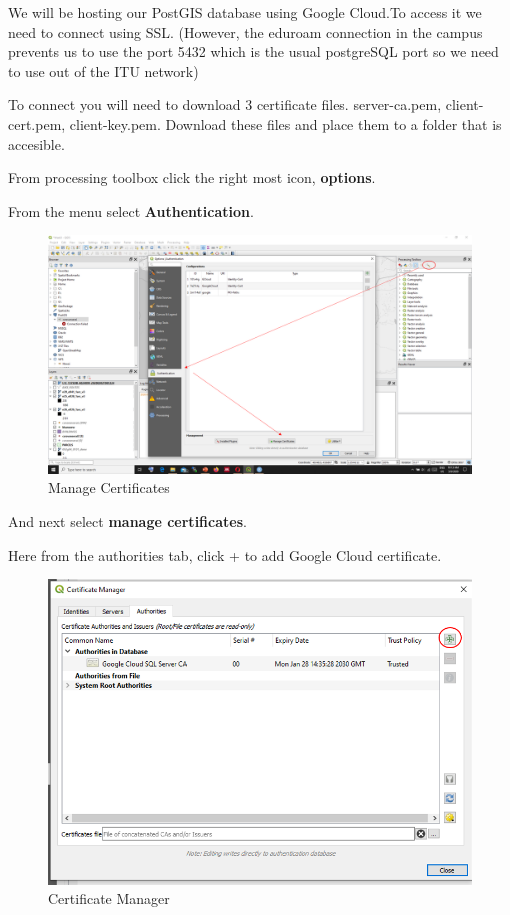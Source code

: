 \documentclass[
]{book}
\begin{document}
We will be hosting our PostGIS database using Google Cloud.To access it we need to connect using SSL. (However, the eduroam connection in the campus prevents us to use the port 5432 which is the usual postgreSQL port so we need to use out of the ITU network)

To connect you will need to download 3 certificate files. server-ca.pem, client-cert.pem, client-key.pem. Download these files and place them to a folder that is accesible.

From processing toolbox click the right most icon, \textbf{options}.

From the menu select \textbf{Authentication}.

\begin{figure}
\centering
\includegraphics{Images/ManageCertificates.png}
\caption{Manage Certificates}
\end{figure}

And next select \textbf{manage certificates}.

Here from the authorities tab, click + to add Google Cloud certificate.

\begin{figure}
\centering
\includegraphics{Images/certificatemanager.png}
\caption{Certificate Manager}
\end{figure}
\end{document}
